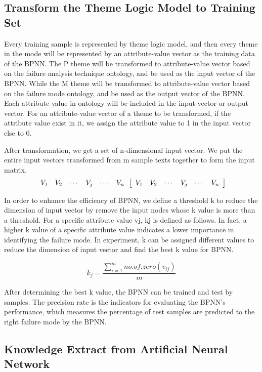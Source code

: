 \documentclass{elsarticle}
\begin{document}
\subsection{Transform the Theme Logic Model to Training Set}
\label{sec:transf-theme-logic}

Every training sample is represented by theme logic model, and then every theme in the mode will be represented by an attribute-value vector as the training data of the BPNN. The P theme will be transformed to attribute-value vector based on the failure analysis technique ontology, and be used as the input vector of the BPNN. While the M theme will be transformed to attribute-value vector based on the failure mode ontology, and be used as the output vector of the BPNN. Each attribute value in ontology will be included in the input vector or output vector. For an attribute-value vector of a theme to be transformed, if the attribute value exist in it, we assign the attribute value to 1 in the input vector else to 0. 

After transformation, we get a set of n-dimensional input vector. We put the entire input vectors transformed from m sample texts together to form the input matrix. 
\[\begin{array}{cccccc}
    V_1&V_2&\cdots&V_j&\cdots&V_n
\end{array}
\newline
\left[  
  \begin{array}{cccccc}
    V_1&V_2&\cdots&V_j&\cdots&V_n
  \end{array} \right]
\]

In order to enhance the efficiency of BPNN, we define a threshold k to reduce the dimension of input vector by remove the input nodes whose k value is more than a threshold. For a specific attribute value vj, kj is defined as follows. In fact, a higher k value of a specific attribute value indicates a lower importance in identifying the failure mode. In experiment, k can be assigned different values to reduce the dimension of input vector and find the best k value for BPNN.

\[k_j = \frac{\sum_{i=1}^{m}no.of.zero(v_{ij})}{m}\]

After determining the best k value, the BPNN can be trained and test by samples. The precision rate is the indicators for evaluating the BPNN’s performance, which measures the percentage of test samples are predicted to the right failure mode by the BPNN. 

\subsection{Knowledge Extract from Artificial Neural Network }
\label{sec:knowl-extr-from}
\end{document}
